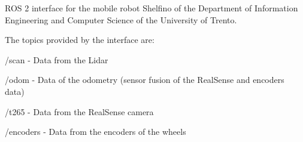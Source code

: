 ROS 2 interface for the mobile robot Shelfino of the Department of Information Engineering and Computer Science of the University of Trento.

The topics provided by the interface are\+:

/scan -\/ Data from the Lidar

/odom -\/ Data of the odometry (sensor fusion of the Real\+Sense and encoders data)

/t265 -\/ Data from the Real\+Sense camera

/encoders -\/ Data from the encoders of the wheels 